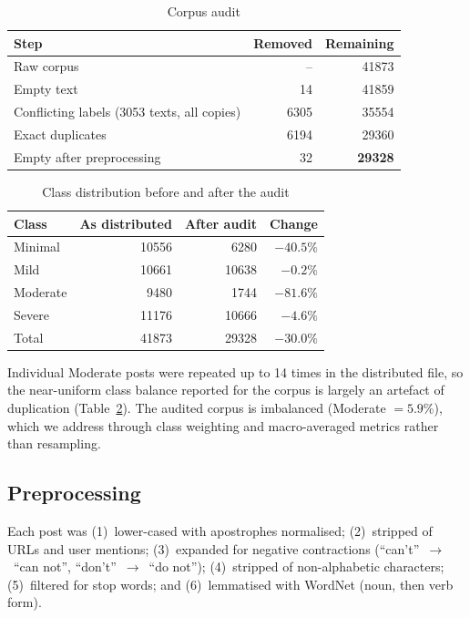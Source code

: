 \documentclass[conference]{IEEEtran}
\begin{document}
\begin{table}[!htbp]
\centering
\caption{Corpus audit}
\label{tab:audit}
\begin{tabular}{lrr}
\toprule
Step & Removed & Remaining \\
\midrule
Raw corpus & -- & \num{41873} \\
Empty text & 14 & \num{41859} \\
Conflicting labels (\num{3053} texts, all copies) & \num{6305} & \num{35554} \\
Exact duplicates & \num{6194} & \num{29360} \\
Empty after preprocessing & 32 & \textbf{\num{29328}} \\
\bottomrule
\end{tabular}
\end{table}

\begin{table}[!htbp]
\centering
\caption{Class distribution before and after the audit}
\label{tab:classes}
\begin{tabular}{lrrr}
\toprule
Class & As distributed & After audit & Change \\
\midrule
Minimal  & \num{10556} & \num{6280}  & $-40.5\%$ \\
Mild     & \num{10661} & \num{10638} & $-0.2\%$ \\
Moderate & \num{9480}  & \num{1744}  & $-81.6\%$ \\
Severe   & \num{11176} & \num{10666} & $-4.6\%$ \\
\midrule
Total    & \num{41873} & \num{29328} & $-30.0\%$ \\
\bottomrule
\end{tabular}
\end{table}

Individual Moderate posts were repeated up to 14 times in the distributed file, so the near-uniform class balance reported for the corpus is largely an artefact of duplication (Table~\ref{tab:classes}). The audited corpus is imbalanced (Moderate $=5.9\%$), which we address through class weighting and macro-averaged metrics rather than resampling.

\subsection{Preprocessing}\label{sec:prep}

Each post was (1)~lower-cased with apostrophes normalised; (2)~stripped of URLs and user mentions; (3)~expanded for negative contractions (``can't''~$\to$~``can not'', ``don't''~$\to$~``do not''); (4)~stripped of non-alphabetic characters; (5)~filtered for stop words; and (6)~lemmatised with WordNet (noun, then verb form).
\end{document}
